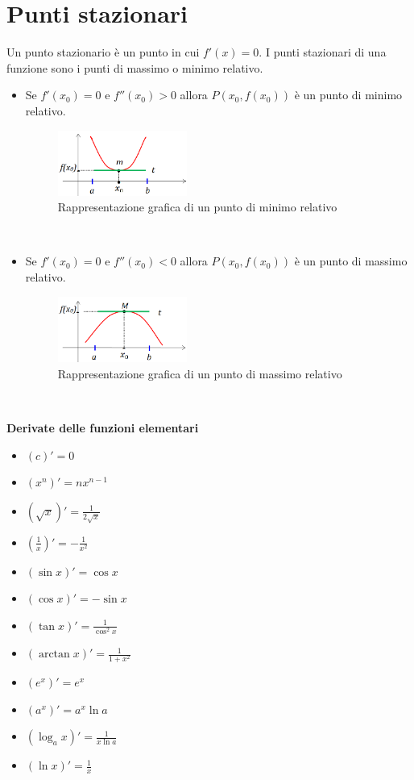\documentclass{article}
\begin{document}
\section*{Punti stazionari}
Un punto stazionario è un punto in cui $f'(x)=0$.
I punti stazionari di una funzione sono i punti di massimo o minimo relativo.
\begin{itemize}
\item Se $f'(x_0)=0$ e $f''(x_0)>0$ allora $P(x_0,f(x_0))$ è un punto di minimo
relativo.
\begin{figure}[h]
    \centering
    \includegraphics[width=0.4\textwidth]{minrel.png}
    \caption{Rappresentazione grafica di un punto di minimo relativo}
\end{figure}\\
\item Se $f'(x_0)=0$ e $f''(x_0)<0$ allora $P(x_0,f(x_0))$ è un punto di massimo
relativo.
\begin{figure}[h]
\centering
\includegraphics[width=0.4\textwidth]{maxrel.png}
\caption{Rappresentazione grafica di un punto di massimo relativo}
\end{figure}\\
\end{itemize}
\newpage
\textbf{Derivate delle funzioni elementari}
    \begin{itemize}
    \item $(c)'=0$
    \item $(x^n)'=nx^{n-1}$
    \item $(\sqrt{x})'=\frac{1}{2\sqrt{x}}$
    \item $(\frac{1}{x})'=-\frac{1}{x^2}$
    \item $(\sin x)'=\cos x$
    \item $(\cos x)'=-\sin x$
    \item $(\tan x)'=\frac{1}{\cos^2 x}$
    \item $(\arctan x)'=\frac{1}{1+x^2}$
    \item $(e^x)'=e^x$
    \item $(a^x)'=a^x\ln a$
    \item $(\log_a x)'=\frac{1}{x\ln a}$
    \item $(\ln x)'=\frac{1}{x}$
    \end{itemize}
\end{document}
